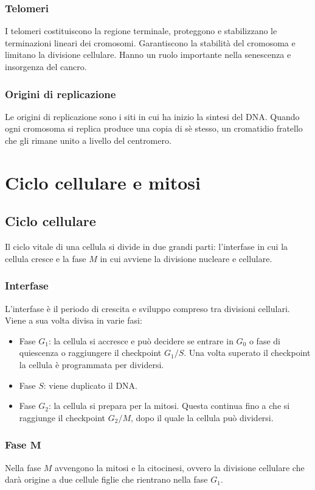 \subsubsection{Telomeri}
I telomeri costituiscono la regione terminale, proteggono e stabilizzano le terminazioni lineari dei cromosomi. Garantiscono la stabilit\`a del cromosoma e limitano la divisione cellulare. Hanno un 
ruolo importante nella senescenza e insorgenza del cancro.
\subsubsection{Origini di replicazione}
Le origini di replicazione sono i siti in cui ha inizio la sintesi del DNA. Quando ogni cromosoma si replica produce una copia di s\`e stesso, un cromatidio fratello che gli rimane unito a livello del
centromero. 
\section{Ciclo cellulare e mitosi}
\subsection{Ciclo cellulare}
Il ciclo vitale di una cellula si divide in due grandi parti: l'interfase in cui la cellula cresce e la fase $M$ in cui avviene la divisione nucleare e cellulare. 
\subsubsection{Interfase}
L'interfase  \`e il periodo di crescita e sviluppo compreso tra divisioni cellulari. Viene a sua volta divisa in varie fasi: 
\begin{itemize}
	\item Fase $G_1$: la cellula si accresce e pu\`o decidere se entrare in $G_0$ o fase di quiescenza o raggiungere il checkpoint $G_1/S$. Una volta superato il checkpoint la
		cellula \`e programmata per dividersi.
	\item Fase $S$: viene duplicato il DNA.
	\item Fase $G_2$: la cellula si prepara per la mitosi. Questa continua fino a che si raggiunge il checkpoint $G_2/M$, dopo il quale la cellula pu\`o dividersi. 

\end{itemize}
\subsubsection{Fase $\mathbf{M}$}
Nella fase $M$ avvengono la mitosi e la citocinesi, ovvero la divisione cellulare che dar\`a origine a due cellule figlie che rientrano nella fase $G_1$.
